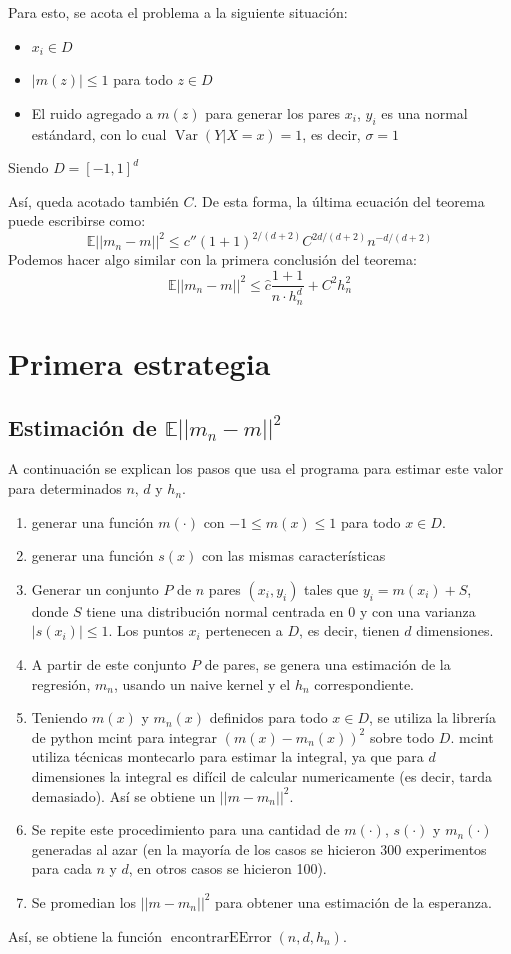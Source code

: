 \documentclass[12pt, a4paper]{article}
\begin{document}
Para esto, se acota el problema a la siguiente situación:
\begin{itemize}
  \item $ x_i \in D$
  \item $|m(z)|\leq 1 $ para todo $z\in D$
  \item El ruido agregado a $m(z)$ para generar los pares $x_i$, $y_i$ es una normal estándard, con lo cual $\mathop{Var}(Y|X=x) = 1$, es decir, $\sigma=1$
\end{itemize}

Siendo $D=[-1,1]^d$

Así, queda acotado también $C$. De esta forma, la última ecuación del teorema puede escribirse como:
$$
\mathds{E}||m_n - m||^2 \leq c'' (1+1)^{2/(d+2)} C^{2d/(d+2)} n^{-d/(d+2)}
$$
Podemos hacer algo similar con la primera conclusión del teorema:
$$
\mathds{E}|| m_n -m ||^2 \leq \hat{c} \dfrac{ 1 + 1 }{n \cdot h_n^d} +C^2h_n^2
$$
\section{Primera estrategia}

\subsection{Estimación de $\mathds{E}|| m_n-m ||^2$}
A continuación se explican los pasos que usa el programa para estimar este valor para determinados $n$, $d$ y $h_n$.
\begin{enumerate}
  \item generar una función $m(\cdot)$ con $-1 \leq m(x) \leq 1$ para todo $x \in D$.
  \item generar una función $s(x)$ con las mismas características
  \item Generar un conjunto $P$ de $n$ pares $(x_i,y_i)$ tales que $y_i = m(x_i) + S$, donde $S$ tiene una distribución normal centrada en 0 y con una varianza $|s(x_i)| \leq 1$. Los puntos $x_i$ pertenecen a $D$, es decir, tienen $d$ dimensiones.
  \item A partir de este conjunto $P$ de pares, se genera una estimación de la regresión, $m_n$, usando un naive kernel y el $h_n$ correspondiente.
  \item Teniendo $m(x)$ y $m_n(x)$ definidos para todo $x\in D$, se utiliza la librería de python mcint para integrar $(m(x)-m_n(x))^2$ sobre todo $D$. mcint utiliza técnicas montecarlo para estimar la integral, ya que para $d$ dimensiones la integral es difícil de calcular numericamente (es decir, tarda demasiado). Así se obtiene un $||m-m_n||^2$.
  \item Se repite este procedimiento para una cantidad de $m(\cdot)$, $s(\cdot)$ y $m_n(\cdot)$ generadas al azar (en la mayoría de los casos se hicieron 300 experimentos para cada $n$ y $d$, en otros casos se hicieron 100).
  \item Se promedian los $||m-m_n||^2$ para obtener una estimación de la esperanza.
\end{enumerate}
Así, se obtiene la función $\mathop{encontrarEError}(n,d,h_n)$.
\end{document}
